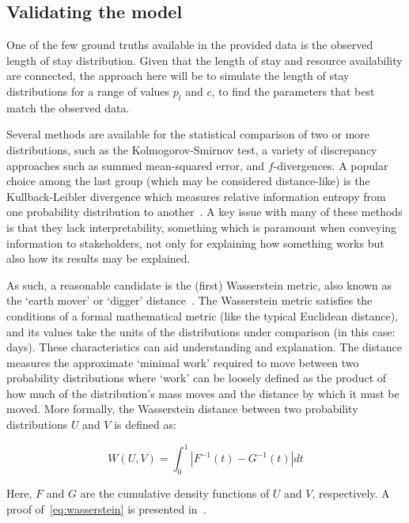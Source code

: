 \subsection{Validating the model}\label{subsec:validate}

One of the few ground truths available in the provided data is the observed
length of stay distribution. Given that the length of stay and resource
availability are connected, the approach here will be to simulate the length of
stay distributions for a range of values \(p_l\) and \(c\), to find the
parameters that best match the observed data.

Several methods are available for the statistical comparison of two or more
distributions, such as the Kolmogorov-Smirnov test, a variety of discrepancy
approaches such as summed mean-squared error, and \(f\)-divergences. A popular
choice among the last group (which may be considered distance-like) is the
Kullback-Leibler divergence which measures relative information entropy from one
probability distribution to another~\cite{Kullback1951}. A key issue with many
of these methods is that they lack interpretability, something which is
paramount when conveying information to stakeholders, not only for explaining
how something works but also how its results may be explained.

As such, a reasonable candidate is the (first) Wasserstein metric, also known as
the `earth mover' or `digger' distance~\cite{Vaserstein1969}. The Wasserstein
metric satisfies the conditions of a formal mathematical metric (like the
typical Euclidean distance), and its values take the units of the distributions
under comparison (in this case: days). These characteristics can aid
understanding and explanation. The distance measures the approximate `minimal
work' required to move between two probability distributions where `work' can be
loosely defined as the product of how much of the distribution's mass moves and
the distance by which it must be moved. More formally, the Wasserstein distance
between two probability distributions \(U\) and \(V\) is defined as:

\begin{equation}\label{eq:wasserstein}
    W(U, V) = \int_{0}^{1} \left\vert F^{-1}(t) - G^{-1}(t) \right\vert dt
\end{equation}

Here, \(F\) and \(G\) are the cumulative density functions of \(U\) and \(V\),
respectively. A proof of~\eqref{eq:wasserstein} is presented
in~\cite{Ramdas2017}.


